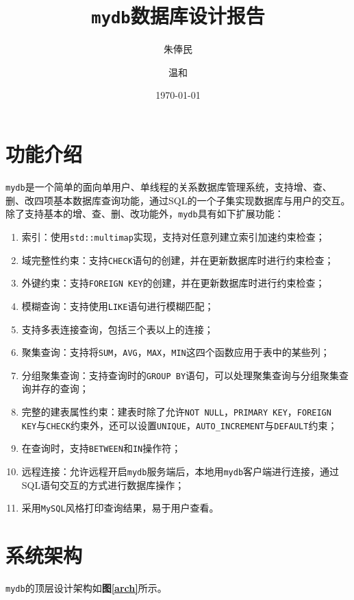 \documentclass[11pt, a4paper]{article}
\title{\textbf{\texttt{mydb}数据库设计报告}}
\author{\kai 朱俸民\quad 2012011894
\and \kai 温和\quad 2013011407}
\date{\kai \today}
\newcommand{\fref}[1]{\textbf{图\ref{#1}}}
\begin{document}
\maketitle

\section{功能介绍}

\texttt{mydb}是一个简单的面向单用户、单线程的关系数据库管理系统，支持增、查、删、改四项基本数据库查询功能，通过SQL的一个子集实现数据库与用户的交互。除了支持基本的增、查、删、改功能外，\texttt{mydb}具有如下扩展功能：

\begin{enumerate}
    \item 索引：使用\texttt{std::multimap}实现，支持对任意列建立索引加速约束检查；
    \item 域完整性约束：支持\texttt{CHECK}语句的创建，并在更新数据库时进行约束检查；
    \item 外键约束：支持\texttt{FOREIGN KEY}的创建，并在更新数据库时进行约束检查；
    \item 模糊查询：支持使用\texttt{LIKE}语句进行模糊匹配；
    \item 支持多表连接查询，包括三个表以上的连接；
    \item 聚集查询：支持将\texttt{SUM}，\texttt{AVG}，\texttt{MAX}，\texttt{MIN}这四个函数应用于表中的某些列；
    \item 分组聚集查询：支持查询时的\texttt{GROUP BY}语句，可以处理聚集查询与分组聚集查询并存的查询；
    \item 完整的建表属性约束：建表时除了允许\texttt{NOT NULL}，\texttt{PRIMARY KEY}，\texttt{FOREIGN KEY}与\texttt{CHECK}约束外，还可以设置\texttt{UNIQUE}，\texttt{AUTO\_INCREMENT}与\texttt{DEFAULT}约束；
    \item 在查询时，支持\texttt{BETWEEN}和\texttt{IN}操作符；
    \item 远程连接：允许远程开启\texttt{mydb}服务端后，本地用\texttt{mydb}客户端进行连接，通过SQL语句交互的方式进行数据库操作；
    \item 采用\texttt{MySQL}风格打印查询结果，易于用户查看。
\end{enumerate}

\section{系统架构}

\texttt{mydb}的顶层设计架构如\fref{arch}所示。
\end{document}
